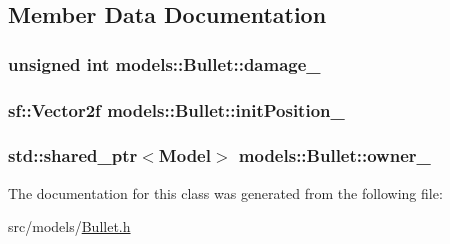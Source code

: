 \subsection{\-Member \-Data \-Documentation}
\hypertarget{classmodels_1_1Bullet_a5256a31799415b2105c3f454fb7e9acc}{
\subsubsection[{damage\-\_\-}]{\setlength{\rightskip}{0pt plus 5cm}unsigned int {\bf models\-::\-Bullet\-::damage\-\_\-}}}\label{d5/dd0/classmodels_1_1Bullet_a5256a31799415b2105c3f454fb7e9acc}
\hypertarget{classmodels_1_1Bullet_ab798801f3446f0c5ae72627673f06d20}{
\subsubsection[{init\-Position\-\_\-}]{\setlength{\rightskip}{0pt plus 5cm}sf\-::\-Vector2f {\bf models\-::\-Bullet\-::init\-Position\-\_\-}}}\label{d5/dd0/classmodels_1_1Bullet_ab798801f3446f0c5ae72627673f06d20}
\hypertarget{classmodels_1_1Bullet_aa884cf4f6c09e8400524787990caa70c}{
\subsubsection[{owner\-\_\-}]{\setlength{\rightskip}{0pt plus 5cm}std\-::shared\-\_\-ptr$<${\bf \-Model}$>$ {\bf models\-::\-Bullet\-::owner\-\_\-}}}\label{d5/dd0/classmodels_1_1Bullet_aa884cf4f6c09e8400524787990caa70c}


\-The documentation for this class was generated from the following file\-:\begin{DoxyCompactItemize}
\item 
src/models/\hyperlink{Bullet_8h}{\-Bullet.\-h}\end{DoxyCompactItemize}
